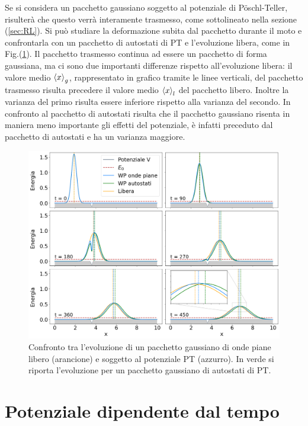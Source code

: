 \documentclass[12pt]{report}
\begin{document}
Se si considera un pacchetto gaussiano soggetto al potenziale di P\"oschl-Teller, risulterà che questo verrà interamente trasmesso, come sottolineato nella sezione (\ref{sec:RL}).
Si può studiare la deformazione subita dal pacchetto durante il moto e confrontarla con un pacchetto di autostati di PT e l'evoluzione libera, come in Fig.(\ref{fig:PT_conf}).
Il pacchetto trasmesso continua ad essere un pacchetto di forma gaussiana, ma ci sono due importanti differenze rispetto all'evoluzione libera: il valore medio $\expval{x}_g$, rappresentato in grafico tramite le linee verticali, del pacchetto trasmesso risulta precedere il valore medio $\expval{x}_l$ del pacchetto libero. Inoltre la varianza del primo risulta essere inferiore rispetto alla varianza del secondo\cite{Lecker:RL}. In confronto al pacchetto di autostati risulta che il pacchetto gaussiano risenta in maniera meno importante gli effetti del potenziale, è infatti preceduto dal pacchetto di autostati e ha un varianza maggiore\cite{Mousavi:PT_WP}.

\begin{figure}
    \centering
    \includegraphics[width = \textwidth]{immagini/PT_num.png}
    \caption{ \textcolor{dark-gray}{Confronto tra l'evoluzione di un pacchetto gaussiano di onde piane libero (arancione) e soggetto al potenziale PT (azzurro). In verde si riporta l'evoluzione per un pacchetto gaussiano di autostati di PT.}}
    \label{fig:PT_conf}
\end{figure}


\section{Potenziale dipendente dal tempo}
\label{sec:t_dep}
\end{document}
